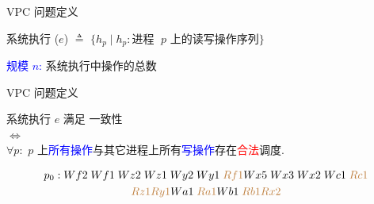\begin{frame}{VPC 问题定义}
  \begin{cdef}[系统执行]
	系统执行 ($e$) $\triangleq$ $\{h_p \mid h_p: \text{进程 } \;p \text{ 上的读写操作序列}\}$

	\vspace{0.30cm}
	\textcolor{blue}{规模 $n$:} 系统执行中操作的总数
  \end{cdef}

\end{frame}
\begin{frame}{VPC 问题定义}
  \begin{cdef}
	\begin{center}
	  系统执行 $e$ 满足 \PRAM{} 一致性 \\
	  $\iff$\\
	  $\forall p:$ $p$ 上\textcolor{blue}{所有操作}与其它进程上所有\textcolor{blue}{写操作}存在\textcolor{red}{合法}调度.
	\end{center}
  \end{cdef}


  \pause
  \vspace{-0.80cm}

  \begin{gather*}
	p_{0}: Wf2\; Wf1\; Wz2\; Wz1\; Wy2\; Wy1\; \textcolor{brown}{Rf1} 
	Wx5\; Wx3\; Wx2\; Wc1\; \textcolor{brown}{Rc1} \\
	\textcolor{brown}{Rz1} \textcolor{brown}{Ry1}
	Wa1\; \textcolor{brown}{Ra1} Wb1\; \textcolor{brown}{Rb1} \textcolor{brown}{Rx2}
  \end{gather*}
\end{frame}
